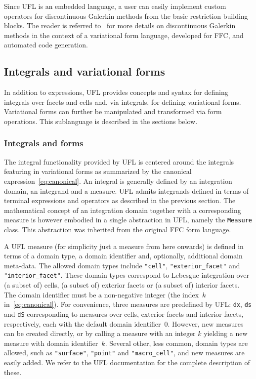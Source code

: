 \documentclass[prodmode,acmtoms]{acmsmall}
\newcommand{\uflc}[1]{\texttt{#1}}
\begin{document}
Since UFL is an embedded language, a user can easily implement custom
operators for discontinuous Galerkin methods from the basic
restriction building blocks. The reader is referred
to~\citet{oelgaard:2008} for more details on discontinuous Galerkin
methods in the context of a variational form language, developed for
FFC, and automated code generation.

\subsection{Integrals and variational forms}
\label{sec:forms}

In addition to expressions, UFL provides concepts and syntax for
defining integrals over facets and cells and, via integrals, for
defining variational forms. Variational forms can further be
manipulated and transformed via form operations. This sublanguage is
described in the sections below.

\subsubsection{Integrals and forms}

The integral functionality provided by UFL is centered around the
integrals featuring in variational forms as summarized by the
canonical expression~\eqref{eq:canonical}. An integral is generally
defined by an integration domain, an integrand and a measure. UFL
admits integrands defined in terms of terminal expressions and
operators as described in the previous section. The mathematical
concept of an integration domain together with a corresponding measure
is however embodied in a single abstraction in UFL, namely the
\uflc{Measure} class. This abstraction was inherited from the
original FFC form language.

A UFL measure (for simplicity just a measure from here onwards) is
defined in terms of a domain type, a domain identifier and,
optionally, additional domain meta-data. The allowed domain types
include \uflc{"cell"}, \uflc{"exterior\_facet"} and
\uflc{"interior\_facet"}. These domain types correspond to Lebesgue
integration over (a subset of) cells, (a subset of) exterior facets or
(a subset of) interior facets.  The domain identifier must be a
non-negative integer (the index~$k$ in~\eqref{eq:canonical}). For
convenience, three measures are predefined by UFL: \uflc{dx},
\uflc{ds} and \uflc{dS} corresponding to measures over cells,
exterior facets and interior facets, respectively, each with the
default domain identifier~$0$. However, new measures can be created
directly, or by calling a measure with an integer $k$ yielding a new
measure with domain identifier~$k$. Several other, less common, domain
types are allowed, such as \uflc{"surface"}, \uflc{"point"} and
\uflc{"macro\_cell"}, and new measures are easily added. We refer to
the UFL documentation for the complete description of these.
\end{document}
